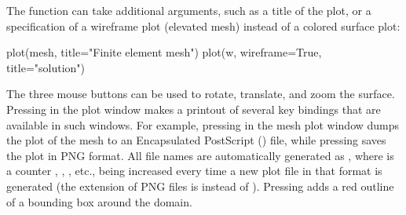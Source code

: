 The  function can take additional
arguments, such as a title of the plot, or a specification of a
wireframe plot (elevated mesh) instead of a colored surface
plot:
\begin{python}
plot(mesh, title="Finite element mesh")
plot(w, wireframe=True, title="solution")
\end{python}

The three mouse buttons can be used to rotate, translate, and zoom the
surface.  Pressing  in the plot
window makes a printout of several key bindings that are available in
such windows. For example, pressing 
in the mesh plot window dumps the plot of the mesh to an Encapsulated
PostScript () file, while pressing
 saves the plot in PNG format.  All
file names are automatically generated as
, where
 is a counter
,
,
, etc., being increased every time
a new plot file in that format is generated (the extension of PNG
files is  instead of
).  Pressing
 adds a red outline of a bounding
box around the domain.

